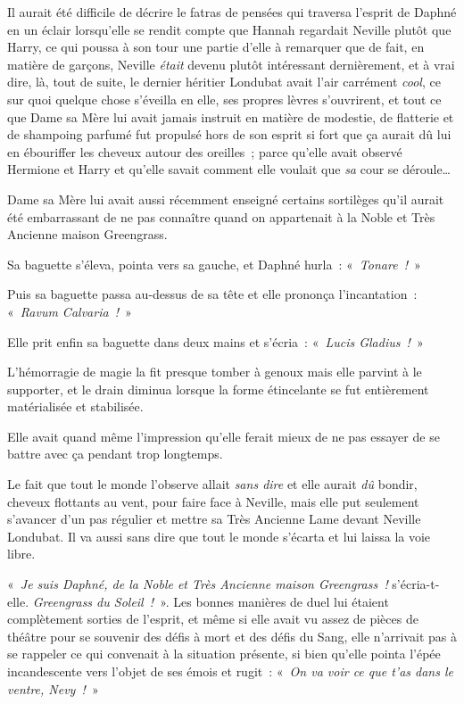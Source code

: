 Il aurait été difficile de décrire le fatras de pensées qui traversa l'esprit de Daphné en un éclair lorsqu'elle se rendit compte que Hannah regardait Neville plutôt que Harry, ce qui poussa à son tour une partie d'elle à remarquer que de fait, en matière de garçons, Neville \emph{était} devenu plutôt intéressant dernièrement, et à vrai dire, là, tout de suite, le dernier héritier Londubat avait l'air carrément \emph{cool}, ce sur quoi quelque chose s'éveilla en elle, ses propres lèvres s'ouvrirent, et tout ce que Dame sa Mère lui avait jamais instruit en matière de modestie, de flatterie et de shampoing parfumé fut propulsé hors de son esprit si fort que ça aurait dû lui en ébouriffer les cheveux autour des oreilles~; parce qu'elle avait observé Hermione et Harry et qu'elle savait comment elle voulait que \emph{sa} cour se déroule…

Dame sa Mère lui avait aussi récemment enseigné certains sortilèges qu'il aurait été embarrassant de ne pas connaître quand on appartenait à la Noble et Très Ancienne maison Greengrass.

Sa baguette s'éleva, pointa vers sa gauche, et Daphné hurla~: «~\emph{Tonare~!}~»

Puis sa baguette passa au-dessus de sa tête et elle prononça l'incantation~: «~\emph{Ravum Calvaria~!}~»

Elle prit enfin sa baguette dans deux mains et s'écria~: «~\emph{Lucis Gladius~!}~»

L'hémorragie de magie la fit presque tomber à genoux mais elle parvint à le supporter, et le drain diminua lorsque la forme étincelante se fut entièrement matérialisée et stabilisée.

Elle avait quand même l'impression qu'elle ferait mieux de ne pas essayer de se battre avec ça pendant trop longtemps.

Le fait que tout le monde l'observe allait \emph{sans dire} et elle aurait \emph{dû} bondir, cheveux flottants au vent, pour faire face à Neville, mais elle put seulement s'avancer d'un pas régulier et mettre sa Très Ancienne Lame devant Neville Londubat.
Il va aussi sans dire que tout le monde s'écarta et lui laissa la voie libre.

«~\emph{Je suis Daphné, de la Noble et Très Ancienne maison Greengrass~!} s'écria-t-elle.
\emph{Greengrass du Soleil~!}~».
Les bonnes manières de duel lui étaient complètement sorties de l'esprit, et même si elle avait vu assez de pièces de théâtre pour se souvenir des défis à mort et des défis du Sang, elle n'arrivait pas à se rappeler ce qui convenait à la situation présente, si bien qu'elle pointa l'épée incandescente vers l'objet de ses émois et rugit~: «~\emph{On va voir ce que t'as dans le ventre, Nevy~!}~»


